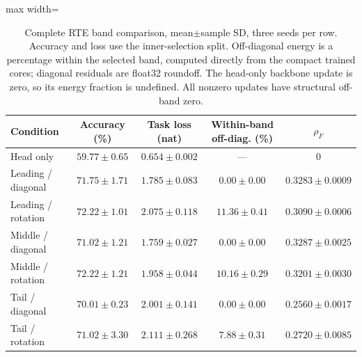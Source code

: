 \documentclass{article}
\begin{document}
\begin{table}[t]
\centering
\caption{Complete RTE band comparison, mean$\pm$sample SD, three seeds per row. Accuracy and loss use the inner-selection split. Off-diagonal energy is a percentage within the selected band, computed directly from the compact trained cores; diagonal residuals are float32 roundoff. The head-only backbone update is zero, so its energy fraction is undefined. All nonzero updates have structural off-band zero.}
\label{tab:bandcomplete}
\begin{adjustbox}{max width=\linewidth}
\begin{tabular}{lcccc}
\toprule
Condition & Accuracy (\%) & Task loss (nat) & Within-band off-diag. (\%) & $\rho_F$\\
\midrule
Head only & $59.77 \pm 0.65$ & $0.654 \pm 0.002$ & --- & $0$ \\
Leading / diagonal & $71.75 \pm 1.71$ & $1.785 \pm 0.083$ & $0.00 \pm 0.00$ & $0.3283 \pm 0.0009$ \\
Leading / rotation & $72.22 \pm 1.01$ & $2.075 \pm 0.118$ & $11.36 \pm 0.41$ & $0.3090 \pm 0.0006$ \\
Middle / diagonal & $71.02 \pm 1.21$ & $1.759 \pm 0.027$ & $0.00 \pm 0.00$ & $0.3287 \pm 0.0025$ \\
Middle / rotation & $72.22 \pm 1.21$ & $1.958 \pm 0.044$ & $10.16 \pm 0.29$ & $0.3201 \pm 0.0030$ \\
Tail / diagonal & $70.01 \pm 0.23$ & $2.001 \pm 0.141$ & $0.00 \pm 0.00$ & $0.2560 \pm 0.0017$ \\
Tail / rotation & $71.02 \pm 3.30$ & $2.111 \pm 0.268$ & $7.88 \pm 0.31$ & $0.2720 \pm 0.0085$ \\
\bottomrule
\end{tabular}
\end{adjustbox}
\end{table}
\end{document}
